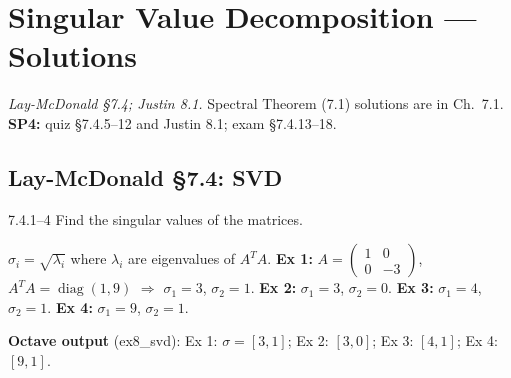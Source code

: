\chapter{Singular Value Decomposition --- Solutions}

\noindent\textit{Lay-McDonald \S7.4; Justin 8.1.} Spectral Theorem (7.1) solutions are in Ch.~7.1. \textbf{SP4:} quiz \S7.4.5--12 and Justin 8.1; exam \S7.4.13--18.

\section*{Lay-McDonald \S7.4: SVD}

\begin{exercise}{7.4.1--4}
Find the singular values of the matrices.
\end{exercise}
\begin{solution}
$\sigma_i=\sqrt{\lambda_i}$ where $\lambda_i$ are eigenvalues of $A^TA$. \textbf{Ex 1:} $A=\begin{pmatrix}1&0\\0&-3\end{pmatrix}$, $A^TA=\operatorname{diag}(1,9)$ $\Rightarrow$ $\sigma_1=3$, $\sigma_2=1$. \textbf{Ex 2:} $\sigma_1=3$, $\sigma_2=0$. \textbf{Ex 3:} $\sigma_1=4$, $\sigma_2=1$. \textbf{Ex 4:} $\sigma_1=9$, $\sigma_2=1$.

\textbf{Octave output} (ex8\_svd): Ex 1: $\sigma=[3,1]$; Ex 2: $[3,0]$; Ex 3: $[4,1]$; Ex 4: $[9,1]$.
\end{solution}

